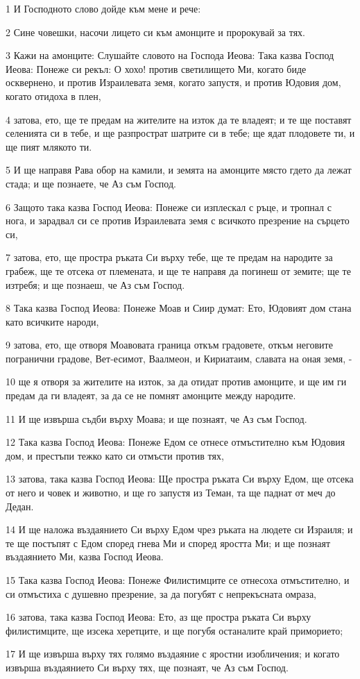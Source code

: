 \par 1 И Господното слово дойде към мене и рече:
\par 2 Сине човешки, насочи лицето си към амонците и пророкувай за тях.
\par 3 Кажи на амонците: Слушайте словото на Господа Иеова: Така казва Господ Иеова: Понеже си рекъл: О хохо! против светилището Ми, когато биде осквернено, и против Израилевата земя, когато запустя, и против Юдовия дом, когато отидоха в плен,
\par 4 затова, ето, ще те предам на жителите на изток да те владеят; и те ще поставят селенията си в тебе, и ще разпрострат шатрите си в тебе; ще ядат плодовете ти, и ще пият млякото ти.
\par 5 И ще направя Рава обор на камили, и земята на амонците място гдето да лежат стада; и ще познаете, че Аз съм Господ.
\par 6 Защото така казва Господ Иеова: Понеже си изплескал с ръце, и тропнал с нога, и зарадвал си се против Израилевата земя с всичкото презрение на сърцето си,
\par 7 затова, ето, ще простра ръката Си върху тебе, ще те предам на народите за грабеж, ще те отсека от племената, и ще те направя да погинеш от земите; ще те изтребя; и ще познаеш, че Аз съм Господ.
\par 8 Така казва Господ Иеова: Понеже Моав и Сиир думат: Ето, Юдовият дом стана като всичките народи,
\par 9 затова, ето, ще отворя Моавовата граница откъм градовете, откъм неговите погранични градове, Вет-есимот, Ваалмеон, и Кириатаим, славата на оная земя, -
\par 10 ще я отворя за жителите на изток, за да отидат против амонците, и ще им ги предам да ги владеят, за да се не помнят амонците между народите.
\par 11 И ще извърша съдби върху Моава; и ще познаят, че Аз съм Господ.
\par 12 Така казва Господ Иеова: Понеже Едом се отнесе отмъстително към Юдовия дом, и престъпи тежко като си отмъсти против тях,
\par 13 затова, така казва Господ Иеова: Ще простра ръката Си върху Едом, ще отсека от него и човек и животно, и ще го запустя из Теман, та ще паднат от меч до Дедан.
\par 14 И ще наложа въздаянието Си върху Едом чрез ръката на людете си Израиля; и те ще постъпят с Едом според гнева Ми и според яростта Ми; и ще познаят въздаянието Ми, казва Господ Иеова.
\par 15 Така казва Господ Иеова: Понеже Филистимците се отнесоха отмъстително, и си отмъстиха с душевно презрение, за да погубят с непрекъсната омраза,
\par 16 затова, така казва Господ Иеова: Ето, аз ще простра ръката Си върху филистимците, ще изсека херетците, и ще погубя останалите край приморието;
\par 17 И ще извърша върху тях голямо въздаяние с яростни изобличения; и когато извърша въздаянието Си върху тях, ще познаят, че Аз съм Господ.

